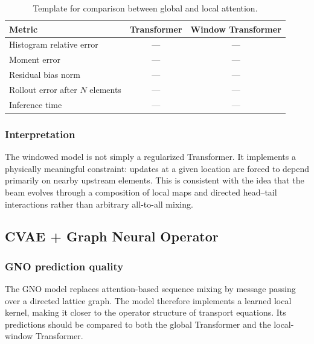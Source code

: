 
\begin{table}[H]
\centering
\caption{Template for comparison between global and local attention.}
\label{tab:transformer_window_comparison}
\begin{tabular}{lcc}
\toprule
Metric & Transformer & Window Transformer \\
\midrule
Histogram relative error & --- & --- \\
Moment error & --- & --- \\
Residual bias norm & --- & --- \\
Rollout error after $N$ elements & --- & --- \\
Inference time & --- & --- \\
\bottomrule
\end{tabular}
\end{table}

\subsubsection{Interpretation}
The windowed model is not simply a regularized Transformer. It implements a physically meaningful constraint: updates at a given location are forced to depend primarily on nearby upstream elements. This is consistent with the idea that the beam evolves through a composition of local maps and directed head--tail interactions rather than arbitrary all-to-all mixing.

\subsection{CVAE + Graph Neural Operator}
\subsubsection{GNO prediction quality}
The GNO model replaces attention-based sequence mixing by message passing over a directed lattice graph. The model therefore implements a learned local kernel, making it closer to the operator structure of transport equations. Its predictions should be compared to both the global Transformer and the local-window Transformer.


